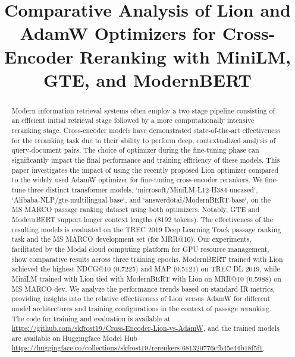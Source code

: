 \documentclass[conference]{IEEEtran}
\begin{document}
\title{Comparative Analysis of Lion and AdamW Optimizers for Cross-Encoder Reranking with MiniLM, GTE, and ModernBERT}

\author{
\and %
}

\maketitle

\begin{abstract}
Modern information retrieval systems often employ a two-stage pipeline consisting of an efficient initial retrieval stage followed by a more computationally intensive reranking stage. Cross-encoder models have demonstrated state-of-the-art effectiveness for the reranking task due to their ability to perform deep, contextualized analysis of query-document pairs. The choice of optimizer during the fine-tuning phase can significantly impact the final performance and training efficiency of these models. This paper investigates the impact of using the recently proposed Lion optimizer compared to the widely used AdamW optimizer for fine-tuning cross-encoder rerankers. We fine-tune three distinct transformer models, `microsoft/MiniLM-L12-H384-uncased`, `Alibaba-NLP/gte-multilingual-base`, and `answerdotai/ModernBERT-base`, on the MS MARCO passage ranking dataset using both optimizers. Notably, GTE and ModernBERT support longer context lengths (8192 tokens). The effectiveness of the resulting models is evaluated on the TREC 2019 Deep Learning Track passage ranking task and the MS MARCO development set (for MRR@10). Our experiments, facilitated by the Modal cloud computing platform for GPU resource management, show comparative results across three training epochs. ModernBERT trained with Lion achieved the highest NDCG@10 (0.7225) and MAP (0.5121) on TREC DL 2019, while MiniLM trained with Lion tied with ModernBERT with Lion on MRR@10 (0.5988) on MS MARCO dev. We analyze the performance trends based on standard IR metrics, providing insights into the relative effectiveness of Lion versus AdamW for different model architectures and training configurations in the context of passage reranking.
The code for training and evaluation is available at \url{https://github.com/skfrost19/Cross-Encoder-Lion-vs-AdamW}, and the trained models are available on Huggingface Model Hub \url{https://huggingface.co/collections/skfrost19/rerenkers-681320776cfb45e44b18f5f1}.
\end{abstract}
\end{document}
